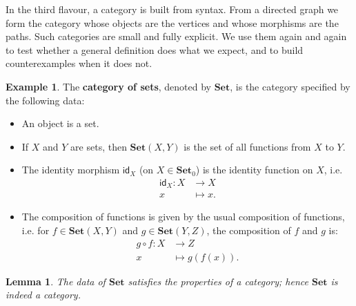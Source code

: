 \documentclass[a4paper,11pt, oneside,titlepage=false]{scrbook}
\theoremstyle{plain}
\newtheorem{lemma}[thm]{Lemma}
\theoremstyle{definition}
\newtheorem{exa}[thm]{Example}
\newcommand{\cfont}[1]{\ensuremath{\mathsf{#1}}}
\newcommand{\Catb}[1]{\mathbf{#1}}
\newcommand{\SET}{\Catb{Set}}
\newcommand{\Ob}[1]{{#1}_0}
\newcommand{\CHom}[3]{{#1}(#2,#3)}
\newcommand{\Id}[1][]{\cfont{id}_{#1}}
\begin{document}
In the third flavour, a category is built from syntax.
From a directed graph we form the category whose objects are the vertices and
whose morphisms are the paths.
Such categories are small and fully explicit.
We use them again and again to test whether a general definition does what we
expect, and to build counterexamples when it does not.

\begin{exa}\label{example:set} The \textbf{category of sets}, denoted by $\SET$, is the category specified by the following data:
\begin{itemize}
\item An object is a set.
\item If $X$ and $Y$ are sets, then $\CHom \SET X Y$ is the set of all functions from $X$ to $Y$.
\item The identity morphism $\Id[X]$ (on $X\in\Ob{\SET}$) is the identity function on $X$, i.e.
\begin{align*}
  \Id[X] : X &\to X
  \\
  x &\mapsto x.
\end{align*}
\item The composition of functions is given by the usual composition of functions, i.e. for $f\in \CHom \SET X Y$ and $g\in \CHom \SET Y Z$, the composition of $f$ and $g$ is:
\begin{align*}
  g \circ f : X&\to Z
  \\
  x &\mapsto g(f(x)).
\end{align*}
\end{itemize}
\end{exa}
\begin{lemma}\label{lemma:set-category}
  The data of $\SET$ satisfies the properties of a category; hence $\SET$ is indeed a category.
\end{lemma}
\end{document}
